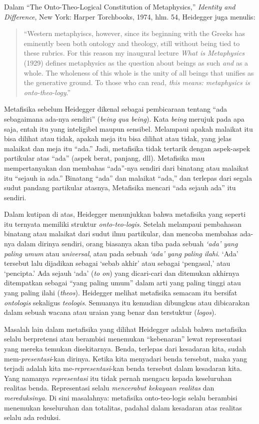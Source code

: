 \documentclass[11pt,twoside,a5paper,openany]{memoir}
\begin{document}
Dalam ``The Onto-Theo-Logical Constitution of Metaphysics,''
\emph{Identity and Difference}, New York: Harper Torchbooks, 1974, hlm.
54, Heidegger juga menulis:

\begin{quote}
``Western metaphyiscs, however, since its beginning with the Greeks has
eminently been both ontology and theology, still without being tied to
these rubrics. For this reason my inaugural lecture \emph{What is
Metaphysics} (1929) defines metaphysics as the question about beings as
such \emph{and} as a whole. The wholeness of this whole is the unity of
all beings that unifies as the generative ground. To those who can read,
\emph{this means: metaphysics is onto-theo-logy}.''
\end{quote}

Metafisika sebelum Heidegger dikenal sebagai pembicaraan tentang ``ada
sebagaimana ada-nya sendiri'' (\emph{being qua being}). Kata
\emph{being} merujuk pada apa saja, entah itu yang inteligibel maupun
sensibel. Melampaui apakah malaikat itu bisa dilihat atau tidak, apakah
meja itu bisa dilihat atau tidak, yang jelas malaikat dan meja itu
``ada.'' Jadi, metafisika tidak tertarik dengan aspek-aspek partikular
atas ``ada'' (aspek berat, panjang, dll). Metafisika mau mempertanyakan
dan membahas ``ada''-nya sendiri dari binatang atau malaikat itu
``sejauh ia ada.'' Binatang ``ada'' dan malaikat ``ada,'' dan terlepas
dari segala sudut pandang partikular atasnya, Metafisika mencari ``ada
sejauh ada'' itu sendiri.

Dalam kutipan di atas, Heidegger menunjukkan bahwa metafisika yang
seperti itu ternyata memiliki struktur \emph{onto-teo-logis}. Setelah
melampaui pembahasan binatang atau malaikat dari sudut ilmu partikular,
dan mencoba membahas ada-nya dalam dirinya sendiri, orang biasanya akan
tiba pada sebuah \emph{`ada' yang paling umum} atau \emph{universal},
atau pada sebuah \emph{`ada' yang paling ilahi}. `Ada' tersebut lalu
dijadikan sebagai `sebab akhir' atau sebagai `pengasal,' atau
`pencipta.' Ada sejauh `ada' (\emph{to on}) yang dicari-cari dan
ditemukan akhirnya ditempatkan sebagai ``yang paling umum'' dalam arti
yang paling tinggi atau yang paling ilahi (\emph{theos}). Heidegger
melihat metafisika semacam itu bersifat \emph{ontologis} sekaligus
\emph{teologis}. Semuanya itu kemudian dibungkus atau dibicarakan dalam
sebuah wacana atau uraian yang benar dan terstuktur (\emph{logos}).

Masalah lain dalam metafisika yang dilihat Heidegger adalah bahwa
metafisika selalu berpretensi atau berambisi menemukan ``kebenaran''
lewat representasi yang mereka temukan disekitarnya. Benda, terlepas
dari kesadaran kita, sudah mem-\emph{presentasi}-kan dirinya. Ketika
kita menyadari benda tersebut, maka yang terjadi adalah kita
me-\emph{representasi}-kan benda tersebut dalam kesadaran kita. Yang
namanya \emph{representasi} itu tidak pernah mengacu kepada keseluruhan
realitas benda. Representasi selalu \emph{mencerabut kekayaan realitas}
dan \emph{mereduksinya}. Di sini masalahnya: metafisika onto-teo-logis
selalu berambisi menemukan keseluruhan dan totalitas, padahal dalam
kesadaran atas realitas selalu ada reduksi.
\end{document}
